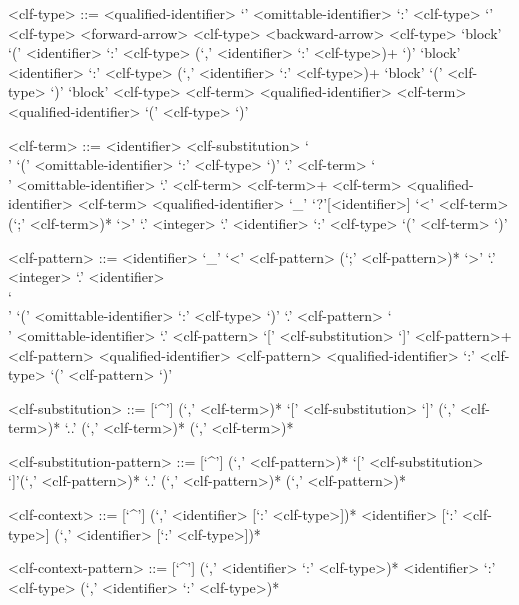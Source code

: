 \begin{grammar}
<clf-type> ::= <qualified-identifier>
\alt `{' <omittable-identifier> `:' <clf-type> `}' <clf-type>
 <forward-arrow> <clf-type>
 <backward-arrow> <clf-type>
\alt `block' `(' <identifier> `:' <clf-type> (`,' <identifier> `:' <clf-type>)+ `)'
\alt `block' <identifier> `:' <clf-type> (`,' <identifier> `:' <clf-type>)+
\alt `block' `(' <clf-type> `)'
\alt `block' <clf-type>
 <clf-term>
 <qualified-identifier> <clf-term>
 <qualified-identifier>
\alt `(' <clf-type> `)'

<clf-term> ::= <identifier>
 <clf-substitution>
\alt `\\' `(' <omittable-identifier> `:' <clf-type> `)' `.' <clf-term>
\alt `\\' <omittable-identifier> `.' <clf-term>
 <clf-term>+
 <clf-term>
 <qualified-identifier> <clf-term>
 <qualified-identifier>
\alt `_'
\alt `?'[<identifier>]
\alt `<' <clf-term> (`;' <clf-term>)* `>'
 `.' <integer>
 `.' <identifier>
 `:' <clf-type>
\alt `(' <clf-term> `)'

<clf-pattern> ::= <identifier>
\alt `_'
\alt `<' <clf-pattern> (`;' <clf-pattern>)* `>'
 `.' <integer>
 `.' <identifier>\\
\alt `\\' `(' <omittable-identifier> `:' <clf-type> `)' `.' <clf-pattern>
\alt `\\' <omittable-identifier> `.' <clf-pattern>
 `[' <clf-substitution> `]'
 <clf-pattern>+
 <clf-pattern>
 <qualified-identifier> <clf-pattern>
 <qualified-identifier>
 `:' <clf-type>
\alt `(' <clf-pattern> `)'

<clf-substitution> ::= [`^']
 (`,' <clf-term>)*
 `[' <clf-substitution> `]' (`,' <clf-term>)*
\alt `..' (`,' <clf-term>)*
 (`,' <clf-term>)*

<clf-substitution-pattern> ::= [`^']
 (`,' <clf-pattern>)*
 `[' <clf-substitution> `]'(`,' <clf-pattern>)*
\alt `..' (`,' <clf-pattern>)*
 (`,' <clf-pattern>)*

<clf-context> ::= [`^']
 (`,' <identifier> [`:' <clf-type>])*
\alt <identifier> [`:' <clf-type>] (`,' <identifier> [`:' <clf-type>])*

<clf-context-pattern> ::= [`^']
 (`,' <identifier> `:' <clf-type>)*
\alt <identifier> `:' <clf-type> (`,' <identifier> `:' <clf-type>)*
\end{grammar}

